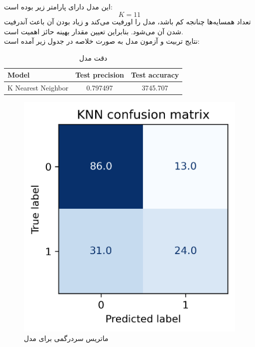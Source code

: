 \documentclass[11pt]{article}
\begin{document}
		\subsection{}
		این مدل دارای پارامتر زیر بوده است:
		$$K = 11$$
		تعداد همسایه‌ها چنانجه کم باشد، مدل را اورفیت می‌کند و زیاد بودن آن باعث آندرفیت شدن آن می‌شود. بنابراین تعیین مقدار بهینه حائز اهمیت است.\\
		نتایج تربیت و آزمون مدل به صورت خلاصه در جدول زیر آمده است:
				\begin{table}[h!]
			\caption{دقت مدل }
			\begin{latin}
				\centering
				\begin{tabular}{|l|c|c|}
					\hline
					\textbf{Model} & \textbf{Test precision} & \textbf{Test accuracy} \\ \hline
					K Nearest Neighbor & 0.797497 & 3745.707 \\ \hline
				\end{tabular}
			\end{latin}
			\label{tab:knn_results}
		\end{table}
		\begin{figure}[!h]
			\centerline{\includegraphics[width=0.5\linewidth]{../HW2_2/KNN confusion.png}}
			\caption{ماتریس سردرگمی برای مدل }
			\label{fig:confusion_knn}
		\end{figure}
		\pagebreak
\end{document}
